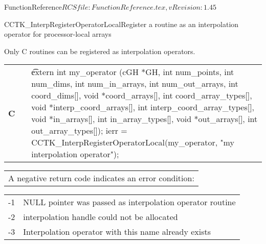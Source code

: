 \begin{cactuspart}{5}{FunctionReference}{$RCSfile: FunctionReference.tex,v $}{$Revision: 1.45 $}
\begin{CCTKFunc}{CCTK\_InterpRegisterOperatorLocal}{Register a routine as an
interpolation operator for processor-local arrays}
\label{CCTK-InterpRegisterOperatorLocal}
\showcargs
\begin{params}
\end{params}
\begin{discussion}
Only C routines can be registered as interpolation operators.
\end{discussion}
\begin{examples}
\begin{tabular}{@{}p{3cm}cp{11cm}}
\hfill {\bf C} && {\t
extern int my\_operator (cGH *GH,\vfill
\hspace{29ex}int num\_points,\vfill
\hspace{29ex}int num\_dims,\vfill
\hspace{29ex}int num\_in\_arrays,\vfill
\hspace{29ex}int num\_out\_arrays,\vfill
\hspace{29ex}int coord\_dims[],\vfill
\hspace{29ex}void *coord\_arrays[],\vfill
\hspace{29ex}int coord\_array\_types[],\vfill
\hspace{29ex}void *interp\_coord\_arrays[],\vfill
\hspace{29ex}int interp\_coord\_array\_types[],\vfill
\hspace{29ex}void *in\_arrays[],\vfill
\hspace{29ex}int in\_array\_types[],\vfill
\hspace{29ex}void *out\_arrays[],\vfill
\hspace{29ex}int out\_array\_types[]);\linebreak
ierr = CCTK\_InterpRegisterOperatorLocal(my\_operator,\vfill
\hspace{2ex}"my interpolation operator");}
\\
\end{tabular}
\end{examples}
\begin{errorcodes}
\begin{tabular}{l}
A negative return code indicates an error condition:
\end{tabular}
\begin{tabular}{ll}
-1 & NULL pointer was passed as interpolation operator routine\\
-2 & interpolation handle could not be allocated\\
-3 & Interpolation operator with this name already exists\\
\end{tabular}
\end{errorcodes}
\end{CCTKFunc}



\end{cactuspart}
